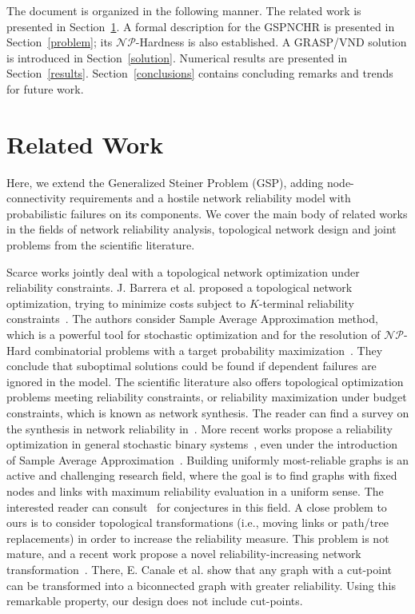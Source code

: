 \documentclass{llncs}
\begin{document}
The document is organized in the following manner. The related work is presented in Section~\ref{work}. 
A formal description for the GSPNCHR is presented in Section~\ref{problem}; its $\mathcal{NP}$-Hardness is also established. 
A GRASP/VND solution is introduced in Section~\ref{solution}. 
Numerical results are presented in Section~\ref{results}. 
Section~\ref{conclusions} contains concluding remarks and trends for future work. 


\section{Related Work} \label{work}
Here, we extend the Generalized Steiner Problem (GSP), adding node-connectivity requirements and a hostile network reliability model with probabilistic failures on its components. We cover the main body of related works in the 
fields of network reliability analysis, topological network design and joint problems from the scientific literature. 

Scarce works jointly deal with a topological network optimization under reliability constraints. J. Barrera et al. proposed a topological network optimization, trying to minimize costs subject to $K$-terminal reliability constraints~\cite{106}. The authors consider Sample Average Approximation method, which is a powerful tool for  stochastic optimization and for the resolution of $\mathcal{NP}$-Hard combinatorial problems with a target probability maximization~\cite{112}. They conclude that suboptimal solutions could be found if dependent failures are ignored in the model. The scientific literature also offers topological optimization problems meeting reliability constraints, or reliability maximization under budget constraints, which is known as network synthesis. 
The reader can find a survey on the synthesis in network reliability in~\cite{113}. 
More recent works propose a reliability optimization in general stochastic binary systems~\cite{107}, even under the introduction of Sample Average Approximation~\cite{114}. Building uniformly most-reliable graphs is an active and challenging research field, where the goal is to find graphs with fixed nodes and links with maximum reliability evaluation in a uniform sense. 
The interested reader can consult~\cite{115} for conjectures in this field. A close problem to ours is to consider topological transformations (i.e., moving links or path/tree replacements) in order to increase the reliability measure. This problem is not mature, and a recent work propose a novel reliability-increasing network transformation~\cite{110}. There, E. Canale et al. show that any graph with a cut-point can be transformed into a biconnected graph with greater reliability. Using this remarkable property, our design does not include cut-points. 
\end{document}
